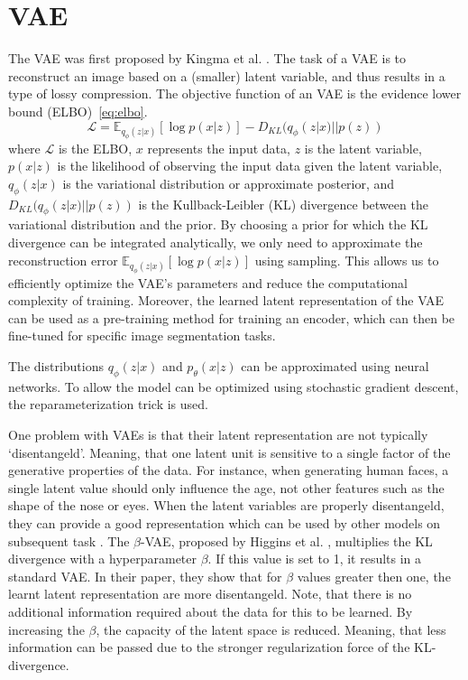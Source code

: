 \section{VAE}
The VAE was first proposed by Kingma et al. \cite{kingma2014autoencodingvariationalbayes}. The task of a VAE is to reconstruct an image based on a (smaller) latent variable, and thus results in a type of lossy compression. The objective function of an VAE is the evidence lower bound (ELBO)~\ref{eq:elbo}.
\begin{equation}
    \label{eq:elbo}
    \mathcal{L} = \mathbb{E}_{q_{\phi}(z|x)}[\log p(x|z)] - D_{KL}(q_{\phi}(z|x) || p(z))
\end{equation}
where $\mathcal{L}$ is the ELBO, $x$ represents the input data, $z$ is the latent variable, $p(x|z)$ is the likelihood of observing the input data given the latent variable, $q_\phi(z|x)$ is the variational distribution or approximate posterior, and $D_{KL}(q_{\phi}(z|x) || p(z))$ is the Kullback-Leibler (KL) divergence between the variational distribution and the prior. By choosing a prior for which the KL divergence can be integrated analytically, we only need to approximate the reconstruction error $\mathbb{E}_{q_{\phi}(z|x)}[\log p(x|z)]$ using sampling. This allows us to efficiently optimize the VAE's parameters and reduce the computational complexity of training. Moreover, the learned latent representation of the VAE can be used as a pre-training method for training an encoder, which can then be fine-tuned for specific image segmentation tasks.

The distributions $q_{\phi}(z | x)$ and $p_{\theta}(x | z)$ can be approximated using neural networks. To allow the model can be optimized using stochastic gradient descent, the reparameterization trick is used.

One problem with VAEs is that their latent representation are not typically `disentangeld'. Meaning, that one latent unit is sensitive to a single factor of the generative properties of the data. For instance, when generating human faces, a single latent value should only influence the age, not other features such as the shape of the nose or eyes. When the latent variables are properly disentangeld, they can provide a good representation which can be used by other models on subsequent task \cite{bengio2014representationlearningreviewnew}. The $\beta$-VAE, proposed by Higgins et al. \cite{higgins2017betavae}, multiplies the KL divergence with a hyperparameter $\beta$. If this value is set to 1, it results in a standard VAE\@. In their paper, they show that for $\beta$ values greater then one, the learnt latent representation are more disentangeld. Note, that there is no additional information required about the data for this to be learned. By increasing the $\beta$, the capacity of the latent space is reduced. Meaning, that less information can be passed due to the stronger regularization force of the KL-divergence.

